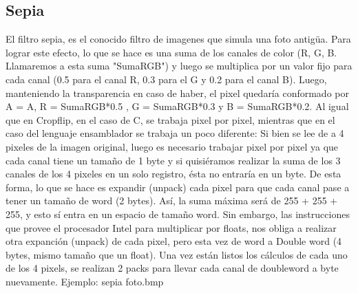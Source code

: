 \documentclass[a4paper]{article}
\begin{document}
\subsection{Sepia}
El filtro sepia, es el conocido filtro de imagenes que simula una foto antigüa. Para lograr este efecto, lo que se hace es una suma
de los canales de color (R, G, B. Llamaremos a esta suma "SumaRGB") y luego se multiplica por un valor fijo para cada canal (0.5 para el canal R, 0.3 para el G
y 0.2 para el canal B). Luego, manteniendo la transparencia en caso de haber, el pixel quedaría conformado por A = A, R = SumaRGB*0.5
, G = SumaRGB*0.3 y B = SumaRGB*0.2. \newline
Al igual que en Cropflip, en el caso de C, se trabaja pixel por pixel, mientras que en el caso del lenguaje ensamblador se trabaja un poco diferente:
Si bien se lee de a 4 pixeles de la imagen original, luego es necesario trabajar pixel por pixel ya que cada canal tiene un tamaño de 1 byte
y si quisiéramos realizar la suma de los 3 canales de los 4 pixeles en un solo registro, ésta no entraría en un byte. De esta forma, lo que se hace
es expandir (unpack) cada pixel para que cada canal pase a tener un tamaño de word (2 bytes). Así, la suma máxima será de 255 + 255 + 255, y esto sí
entra en un espacio de tamaño word. Sin embargo, las instrucciones que provee el procesador Intel para multiplicar por floats, nos obliga
a realizar otra expanción (unpack) de cada pixel, pero esta vez de word a Double word (4 bytes, mismo tamaño que un float).
Una vez están listos los cálculos de cada uno de los 4 pixels, se realizan 2 packs para llevar cada canal de doubleword a byte nuevamente.
\newline
Ejemplo: sepia foto.bmp
\end{document}
